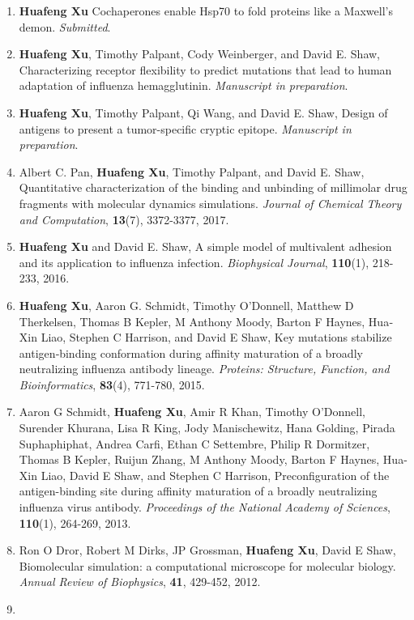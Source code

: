 \documentclass[11pt]{article}
\begin{document}
\begin{enumerate}
\item
\textbf{Huafeng Xu} Cochaperones enable Hsp70 to fold proteins like a Maxwell's demon. \textit{Submitted}.
\item
\textbf{Huafeng Xu}, Timothy Palpant, Cody Weinberger, and David E. Shaw, Characterizing receptor flexibility to predict mutations that lead to human adaptation of influenza hemagglutinin. \textit{Manuscript in preparation}.
\item
\textbf{Huafeng Xu}, Timothy Palpant, Qi Wang, and David E. Shaw, Design of antigens to present a tumor-specific cryptic epitope. \textit{Manuscript in preparation}.
\item
Albert C. Pan, \textbf{Huafeng Xu}, Timothy Palpant, and David E. Shaw, Quantitative characterization of the binding and unbinding of millimolar drug fragments with molecular dynamics simulations. \textit{Journal of Chemical Theory and Computation}, \textbf{13}(7), 3372-3377, 2017.
\item
\textbf{Huafeng Xu} and David E. Shaw, A simple model of multivalent adhesion and its application to influenza infection. \textit{Biophysical Journal}, \textbf{110}(1), 218-233, 2016.
\item
\textbf{Huafeng Xu}, Aaron G. Schmidt, Timothy O'Donnell, Matthew D Therkelsen, Thomas B Kepler, M Anthony Moody, Barton F Haynes, Hua‐Xin Liao, Stephen C Harrison, and David E Shaw, Key mutations stabilize antigen‐binding conformation during affinity maturation of a broadly neutralizing influenza antibody lineage. \textit{Proteins: Structure, Function, and Bioinformatics}, \textbf{83}(4), 771-780, 2015.
\item
Aaron G Schmidt, \textbf{Huafeng Xu}, Amir R Khan, Timothy O’Donnell, Surender Khurana, Lisa R King, Jody Manischewitz, Hana Golding, Pirada Suphaphiphat, Andrea Carfi, Ethan C Settembre, Philip R Dormitzer, Thomas B Kepler, Ruijun Zhang, M Anthony Moody, Barton F Haynes, Hua-Xin Liao, David E Shaw, and Stephen C Harrison, Preconfiguration of the antigen-binding site during affinity maturation of a broadly neutralizing influenza virus antibody. \textit{Proceedings of the National Academy of Sciences}, \textbf{110}(1), 264-269, 2013.
\item
Ron O Dror, Robert M Dirks, JP Grossman, \textbf{Huafeng Xu}, David E Shaw, Biomolecular simulation: a computational microscope for molecular biology. \textit{Annual Review of Biophysics}, \textbf{41}, 429-452, 2012.
\item

\end{enumerate}
\end{document}
